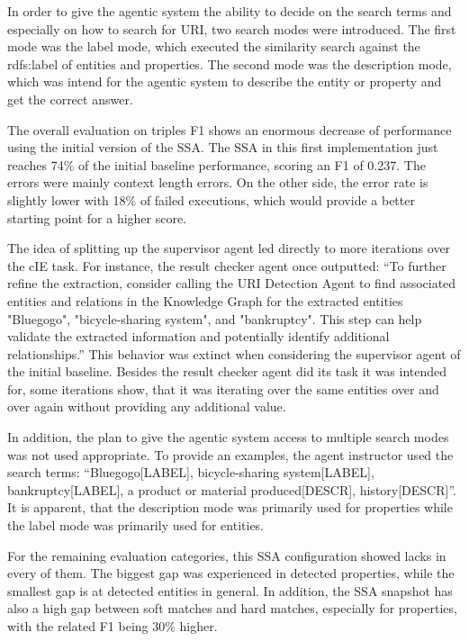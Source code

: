 \documentclass[a4paper,oneside,bibliography=totoc]{scrbook}
\begin{document}
In order to give the agentic system the ability to decide on the search terms and especially on how to search for URI, two search modes were introduced. The first mode was the label mode, which executed the similarity search against the rdfs:label of entities and properties. The second mode was the description mode, which was intend for the agentic system to describe the entity or property and get the correct answer.

The overall evaluation on triples F1 shows an enormous decrease of performance using the initial version of the \ac{SSA}. The \ac{SSA} in this first implementation just reaches 74\% of the initial baseline performance, scoring an F1 of 0.237. The errors were mainly context length errors. On the other side, the error rate is slightly lower with 18\% of failed executions, which would provide a better starting point for a higher score.

The idea of splitting up the supervisor agent led directly to more iterations over the \ac{cIE} task. For instance, the result checker agent once outputted: \enquote{To further refine the extraction, consider calling the URI Detection Agent to find associated entities and relations in the Knowledge Graph for the extracted entities "Bluegogo", "bicycle-sharing system", and "bankruptcy". This step can help validate the extracted information and potentially identify additional relationships.} This behavior was extinct when considering the supervisor agent of the initial baseline. Besides the result checker agent did its task it was intended for, some iterations show, that it was iterating over the same entities over and over again without providing any additional value.

In addition, the plan to give the agentic system access to multiple search modes was not used appropriate. To provide an examples, the agent instructor used the search terms: \enquote{Bluegogo[LABEL], bicycle-sharing system[LABEL], bankruptcy[LABEL], a product or material produced[DESCR], history[DESCR]}. It is apparent, that the description mode was primarily used for properties while the label mode was primarily used for entities.

For the remaining evaluation categories, this \ac{SSA} configuration showed lacks in every of them. The biggest gap was experienced in detected properties, while the smallest gap is at detected entities in general. In addition, the \ac{SSA} snapshot has also a high gap between soft matches and hard matches, especially for properties, with the related F1 being 30\% higher.
\end{document}
